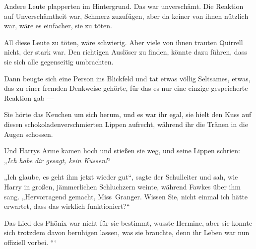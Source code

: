 Andere Leute plapperten im Hintergrund. Das war unverschämt. Die Reaktion auf Unverschämtheit war, Schmerz zuzufügen, aber da keiner von ihnen nützlich war, wäre es einfacher, sie zu töten.

All diese Leute zu töten, wäre schwierig. Aber viele von ihnen trauten Quirrell nicht, der stark war. Den richtigen Auslöser zu finden, könnte dazu führen, dass sie sich alle gegenseitig umbrachten.

Dann beugte sich eine Person ins Blickfeld und tat etwas völlig Seltsames, etwas, das zu einer fremden Denkweise gehörte, für das es nur eine einzige gespeicherte Reaktion gab —

\later

Sie hörte das Keuchen um sich herum, und es war ihr egal, sie hielt den Kuss auf diesen schokoladenverschmierten Lippen aufrecht, während ihr die Tränen in die Augen schossen.

Und Harrys Arme kamen hoch und stießen sie weg, und seine Lippen schrien:
„\emph{Ich habe dir gesagt, kein Küssen!}“

\later

„Ich glaube, es geht ihm jetzt wieder gut“, sagte der Schulleiter und sah, wie Harry in großen, jämmerlichen Schluchzern weinte, während Fawkes über ihm sang.
„Hervorragend gemacht, Miss~Granger. Wissen Sie, nicht einmal ich hätte erwartet, dass das wirklich funktioniert?“

Das Lied des Phönix war nicht für sie bestimmt, wusste Hermine, aber sie konnte sich trotzdem davon beruhigen lassen, was sie brauchte, denn ihr Leben war nun offiziell vorbei.
```